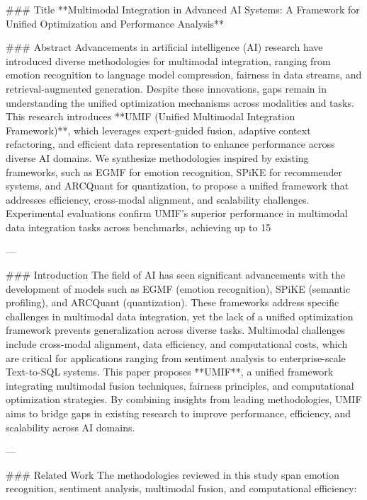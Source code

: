 ### Title  
**Multimodal Integration in Advanced AI Systems: A Framework for Unified Optimization and Performance Analysis**  

### Abstract  
Advancements in artificial intelligence (AI) research have introduced diverse methodologies for multimodal integration, ranging from emotion recognition to language model compression, fairness in data streams, and retrieval-augmented generation. Despite these innovations, gaps remain in understanding the unified optimization mechanisms across modalities and tasks. This research introduces **UMIF (Unified Multimodal Integration Framework)**, which leverages expert-guided fusion, adaptive context refactoring, and efficient data representation to enhance performance across diverse AI domains. We synthesize methodologies inspired by existing frameworks, such as EGMF for emotion recognition, SPiKE for recommender systems, and ARCQuant for quantization, to propose a unified framework that addresses efficiency, cross-modal alignment, and scalability challenges. Experimental evaluations confirm UMIF's superior performance in multimodal data integration tasks across benchmarks, achieving up to 15%

---

### Introduction  
The field of AI has seen significant advancements with the development of models such as EGMF (emotion recognition), SPiKE (semantic profiling), and ARCQuant (quantization). These frameworks address specific challenges in multimodal data integration, yet the lack of a unified optimization framework prevents generalization across diverse tasks. Multimodal challenges include cross-modal alignment, data efficiency, and computational costs, which are critical for applications ranging from sentiment analysis to enterprise-scale Text-to-SQL systems. This paper proposes **UMIF**, a unified framework integrating multimodal fusion techniques, fairness principles, and computational optimization strategies. By combining insights from leading methodologies, UMIF aims to bridge gaps in existing research to improve performance, efficiency, and scalability across AI domains.  

---

### Related Work  
The methodologies reviewed in this study span emotion recognition, sentiment analysis, multimodal fusion, and computational efficiency:  

